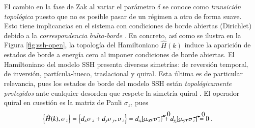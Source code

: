 El cambio en la fase de Zak al variar el parámetro $\delta$  se conoce como \textit{transición topológica} puesto que no es posible pasar de un régimen a otro de forma suave. Esto tiene implicancias en el sistema con condiciones de borde abiertas (Dirichlet) debido a la \textit{correspondencia bulto-borde} \cite{topobulk}. En concreto, así como se ilustra en la Figura \ref{fig:ssh-open}, la topología del Hamiltoniano $\hat{H}(k)$ induce la aparición de estados de borde a energía cero al imponer condiciones de borde abiertas.
El Hamiltoniano del modelo SSH presenta diversas simetrías: de reversión temporal, de inversión, partícula-hueco, traslacional y quiral. Esta última es de particular relevancia, pues los estados de borde del modelo SSH están \textit{topológicamente protegidos} ante cualquier desorden que respete la simetría quiral \cite{ssh-course}. El operador quiral en cuestión es la matriz de Pauli $\sigma_z$, pues 
\begin{align*}
	\left\{\hat{H}(k), \sigma_z \right\} = \left\{d_x \sigma_x + d_y\sigma_y , \sigma_z \right\} = d_x \cancelto{0}{\left\{\sigma_x, \sigma_z \right\}} + d_y \cancelto{0}{\{\sigma_y, \sigma_z\}} = 0 \ .
\end{align*}
